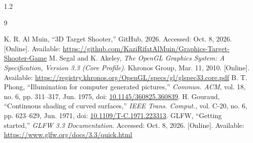 \begin{spacing}{1.2}\begin{thebibliography}{9}\raggedright
{} K. R. Al Muin, ``3D Target Shooter,'' GitHub, 2026. Accessed: Oct. 8, 2026. [Online]. Available: \url{https://github.com/KaziRifatAlMuin/Graphics-Target-Shooter-Game}
 M. Segal and K. Akeley, \emph{The OpenGL Graphics System: A Specification, Version 3.3 (Core Profile)}. Khronos Group, Mar. 11, 2010. [Online]. Available: \url{https://registry.khronos.org/OpenGL/specs/gl/glspec33.core.pdf}
 B. T. Phong, ``Illumination for computer generated pictures,'' \emph{Commun. ACM}, vol. 18, no. 6, pp. 311--317, Jun. 1975, doi: \href{https://doi.org/10.1145/360825.360839}{10.1145/360825.360839}.
 H. Gouraud, ``Continuous shading of curved surfaces,'' \emph{IEEE Trans. Comput.}, vol. C-20, no. 6, pp. 623--629, Jun. 1971, doi: \href{https://doi.org/10.1109/T-C.1971.223313}{10.1109/T-C.1971.223313}.
 GLFW, ``Getting started,'' \emph{GLFW 3.3 Documentation}. Accessed: Oct. 8, 2026. [Online]. Available: \url{https://www.glfw.org/docs/3.3/quick.html}
\end{thebibliography}\end{spacing}
